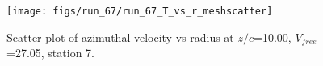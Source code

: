 \begin{figure}[H]
\centering
\texttt{[image: figs/run\_67/run\_67\_T\_vs\_r\_meshscatter]}
\caption{Scatter plot of azimuthal velocity vs radius at $z/c$=10.00, $V_{free}$=27.05, station 7.}
\label{fig:run_67_T_vs_r_meshscatter}
\end{figure}


